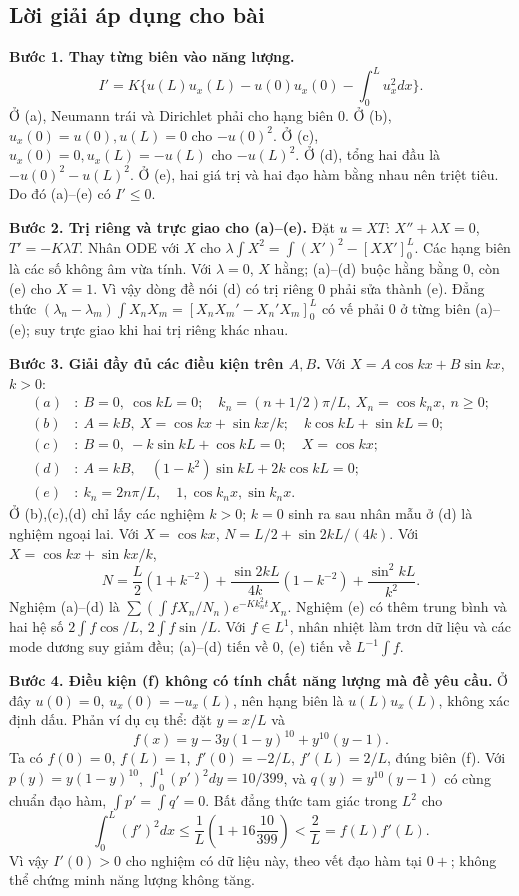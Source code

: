 \documentclass[10pt,a4paper]{article}
\begin{document}
\subsection*{Lời giải áp dụng cho bài}
\textbf{Bước 1. Thay từng biên vào năng lượng.}
\[I'=K\{u(L)u_x(L)-u(0)u_x(0)-\int_0^Lu_x^2dx\}.\]
Ở (a), Neumann trái và Dirichlet phải cho hạng biên $0$. Ở (b), $u_x(0)=u(0),u(L)=0$ cho $-u(0)^2$. Ở (c), $u_x(0)=0,u_x(L)=-u(L)$ cho $-u(L)^2$. Ở (d), tổng hai đầu là $-u(0)^2-u(L)^2$. Ở (e), hai giá trị và hai đạo hàm bằng nhau nên triệt tiêu. Do đó (a)--(e) có $I'\le0$.

\textbf{Bước 2. Trị riêng và trực giao cho (a)--(e).}
Đặt $u=XT$: $X''+\lambda X=0$, $T'=-K\lambda T$. Nhân ODE với $X$ cho $\lambda\int X^2=\int(X')^2-[XX']_0^L$. Các hạng biên là các số không âm vừa tính. Với $\lambda=0$, $X$ hằng; (a)--(d) buộc hằng bằng $0$, còn (e) cho $X=1$. Vì vậy dòng đề nói (d) có trị riêng $0$ phải sửa thành (e). Đẳng thức $(\lambda_n-\lambda_m)\int X_nX_m=[X_nX_m'-X_n'X_m]_0^L$ có vế phải $0$ ở từng biên (a)--(e); suy trực giao khi hai trị riêng khác nhau.

\textbf{Bước 3. Giải đầy đủ các điều kiện trên $A,B$.}
Với $X=A\cos kx+B\sin kx$, $k>0$:
\begin{align*}
(a)&:\ B=0,\ \cos kL=0;\quad k_n=(n+1/2)\pi/L,\ X_n=\cos k_nx,\ n\ge0;\\
(b)&:\ A=kB,\ X=\cos kx+\sin kx/k;\quad k\cos kL+\sin kL=0;\\
(c)&:\ B=0,\ -k\sin kL+\cos kL=0;\quad X=\cos kx;\\
(d)&:\ A=kB,\quad (1-k^2)\sin kL+2k\cos kL=0;\\
(e)&:\ k_n=2n\pi/L,\quad 1,\cos k_nx,\sin k_nx.
\end{align*}
Ở (b),(c),(d) chỉ lấy các nghiệm $k>0$; $k=0$ sinh ra sau nhân mẫu ở (d) là nghiệm ngoại lai. Với $X=\cos kx$, $N=L/2+\sin2kL/(4k)$. Với $X=\cos kx+\sin kx/k$,
\[N=\frac L2(1+k^{-2})+\frac{\sin2kL}{4k}(1-k^{-2})+\frac{\sin^2kL}{k^2}.\]
Nghiệm (a)--(d) là $\sum (\int fX_n/N_n)e^{-Kk_n^2t}X_n$. Nghiệm (e) có thêm trung bình và hai hệ số $2\int f\cos/L$, $2\int f\sin/L$. Với $f\in L^1$, nhân nhiệt làm trơn dữ liệu và các mode dương suy giảm đều; (a)--(d) tiến về $0$, (e) tiến về $L^{-1}\int f$.

\textbf{Bước 4. Điều kiện (f) không có tính chất năng lượng mà đề yêu cầu.}
Ở đây $u(0)=0$, $u_x(0)=-u_x(L)$, nên hạng biên là $u(L)u_x(L)$, không xác định dấu. Phản ví dụ cụ thể: đặt $y=x/L$ và
\[f(x)=y-3y(1-y)^{10}+y^{10}(y-1).\]
Ta có $f(0)=0$, $f(L)=1$, $f'(0)=-2/L$, $f'(L)=2/L$, đúng biên (f). Với $p(y)=y(1-y)^{10}$, $\int_0^1(p')^2dy=10/399$, và $q(y)=y^{10}(y-1)$ có cùng chuẩn đạo hàm, $\int p'=\int q'=0$. Bất đẳng thức tam giác trong $L^2$ cho
\[\int_0^L(f')^2dx\le\frac1L\left(1+16\frac{10}{399}\right)<\frac2L=f(L)f'(L).\]
Vì vậy $I'(0)>0$ cho nghiệm có dữ liệu này, theo vết đạo hàm tại $0+$; không thể chứng minh năng lượng không tăng.
\end{document}
